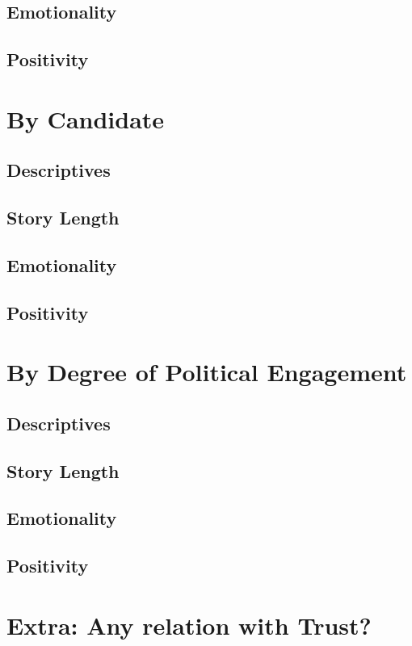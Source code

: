 \subsection{Emotionality}
\subsection{Positivity}

\section{By Candidate}
\subsection{Descriptives}
\subsection{Story Length}
\subsection{Emotionality}
\subsection{Positivity}


\section{By Degree of Political Engagement}
\subsection{Descriptives}
\subsection{Story Length}
\subsection{Emotionality}
\subsection{Positivity}

\section{Extra: Any relation with Trust?}

